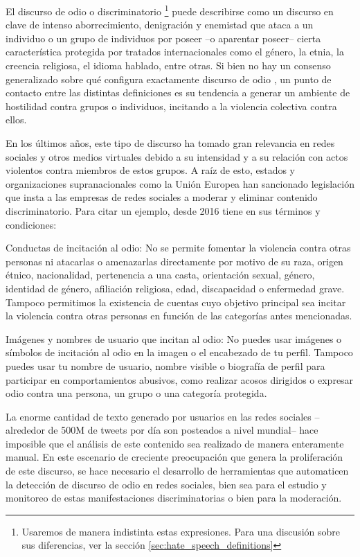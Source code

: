 
El discurso de odio o discriminatorio \footnote{Usaremos de manera indistinta estas expresiones. Para una discusión sobre sus diferencias, ver la sección \ref{sec:hate_speech_definitions}} puede describirse como un discurso en clave de intenso aborrecimiento, denigración y enemistad que ataca a un individuo o un grupo de individuos por poseer --o aparentar poseer-- cierta característica protegida por tratados internacionales como el género, la etnia, la creencia religiosa, el idioma hablado, entre otras. Si bien no hay un consenso generalizado sobre qué configura exactamente discurso de odio \cite{article192015}, un punto de contacto entre las distintas definiciones es su tendencia a generar un ambiente de hostilidad contra grupos o individuos, incitando a la violencia colectiva contra ellos.

En los últimos años, este tipo de discurso ha tomado gran relevancia en redes sociales y otros medios virtuales debido a su intensidad y a su relación con actos violentos contra miembros de estos grupos. A raíz de esto, estados y organizaciones supranacionales como la Unión Europea han sancionado legislación que insta a las empresas de redes sociales a moderar y eliminar contenido discriminatorio. Para citar un ejemplo, desde 2016 \twitter{} tiene en sus términos y condiciones:

\begin{displayquote}
    Conductas de incitación al odio: No se permite fomentar la violencia contra otras personas ni atacarlas o amenazarlas directamente por motivo de su raza, origen étnico, nacionalidad, pertenencia a una casta, orientación sexual, género, identidad de género, afiliación religiosa, edad, discapacidad o enfermedad grave. Tampoco permitimos la existencia de cuentas cuyo objetivo principal sea incitar la violencia contra otras personas en función de las categorías antes mencionadas.

    Imágenes y nombres de usuario que incitan al odio: No puedes usar imágenes o símbolos de incitación al odio en la imagen o el encabezado de tu perfil. Tampoco puedes usar tu nombre de usuario, nombre visible o biografía de perfil para participar en comportamientos abusivos, como realizar acosos dirigidos o expresar odio contra una persona, un grupo o una categoría protegida.
\end{displayquote}

La enorme cantidad de texto generado por usuarios en las redes sociales --alrededor de 500M de tweets por día son posteados a nivel mundial-- hace imposible que el análisis de este contenido sea realizado de manera enteramente manual. En este escenario de creciente preocupación que genera la proliferación de este discurso, se hace necesario el desarrollo de herramientas que automaticen la detección de discurso de odio en redes sociales, bien sea para el estudio y monitoreo de estas manifestaciones discriminatorias o bien para la moderación.

